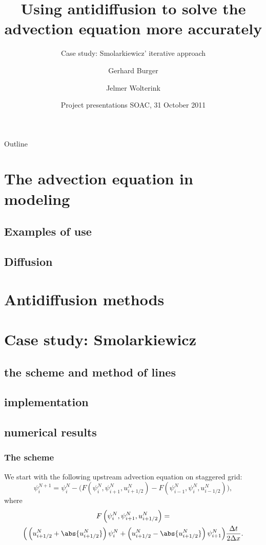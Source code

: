 \documentclass[hyperref={pdfstartview=Fit}]{beamer}
\title[Advection equation and antidiffusion]
{Using antidiffusion to solve the advection equation more accurately}
\subtitle{Case study: Smolarkiewicz' iterative approach}
\author[Burger, Wolterink]
{Gerhard Burger \and Jelmer Wolterink}
\institute[Utrecht University]
{
  Scientific Computing\\
  Department of Mathematics\\
  Utrecht University
}
\date[31-Oct-2011] %
{Project presentations SOAC, 31 October 2011}
\begin{document}
\begin{frame}
  \titlepage
\end{frame}

\begin{frame}{Outline}
  \tableofcontents
\end{frame}

\section{The advection equation in modeling}
\subsection{Examples of use}
\subsection{Diffusion}

\section{Antidiffusion methods}

\section{Case study: Smolarkiewicz}
\subsection{the scheme and method of lines}
\subsection{implementation}
\subsection{numerical results}

\begin{frame}
\frametitle{The scheme}
We start with the following upstream advection equation on staggered grid:
\begin{equation*}
 \psi_i^{N+1} = \psi_i^N - \Big( F \left( \psi_i^N,\psi_{i+1}^N,u_{i+1/2}^N\right)
-F \left( \psi_{i-1}^N,\psi_{i}^N,u_{i-1/2}^N\right) \Big),
\end{equation*}
where
\begin{multline*}
F \left( \psi_i^N,\psi_{i+1}^N,u_{i+1/2}^N\right) =\\
\Big( \left( u_{i+1/2}^N + \abs{u_{i+1/2}^N} \right) \psi_i^N
+ \left( u_{i+1/2}^N - \abs{u_{i+1/2}^N} \right) \psi_{i+1}^N \Big)
\frac{\Delta t}{2 \Delta x}.
\end{multline*}
\end{frame}
\end{document}
